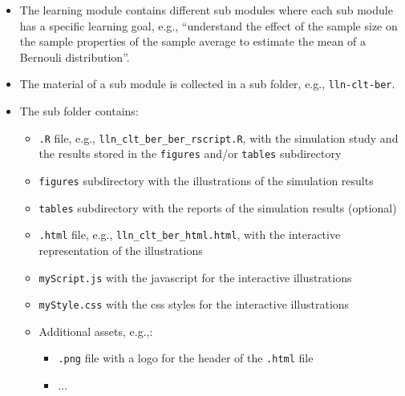 \documentclass{article}
\begin{document}
\begin{itemize}
	\item The learning module contains different sub modules where each sub module has a specific learning goal, e.g., ``understand the effect of the sample size on the sample properties of the sample average to estimate the mean of a Bernouli distribution''.
	\item The material of a sub module is collected in a sub folder, e.g., \texttt{lln-clt-ber}.
	\item The sub folder contains:
	\begin{itemize}
		\item \texttt{.R} file, e.g., \texttt{lln\_clt\_ber\_ber\_rscript.R}, with the simulation study and the results stored in the \texttt{figures} and/or \texttt{tables} subdirectory
		\item \texttt{figures} subdirectory with the illustrations of the simulation results
		\item \texttt{tables} subdirectory with the reports of the simulation results (optional)
		\item \texttt{.html} file, e.g., \texttt{lln\_clt\_ber\_html.html}, with the interactive representation of the illustrations
		\item \texttt{myScript.js} with the javascript for the interactive illustrations
		\item \texttt{myStyle.css} with the css styles for the interactive illustrations
		\item Additional assets, e.g.,:
		\begin{itemize}
			\item \texttt{.png} file with a logo for the header of the \texttt{.html} file
			\item ...
		\end{itemize}
	\end{itemize}
\end{itemize}





	
\end{document}
